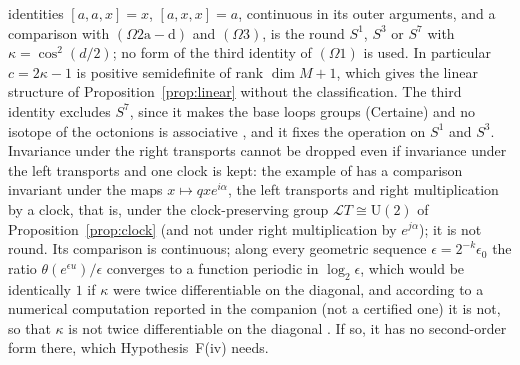 \documentclass[aps,pra,onecolumn,superscriptaddress,nofootinbib,10pt]{revtex4-2}
\theoremstyle{definition}
\theoremstyle{remark}
\newcommand{\cL}{\mathcal{L}}
\newcommand{\hp}[3]{[#1,#2,#3]}
\newcommand{\U}{\mathrm{U}}
\begin{document}
identities $\hp aax=x$, $\hp axx=a$, continuous in its outer arguments, and a comparison with
$(\Omega2\mathrm{a{-}d})$ and $(\Omega3)$, is the round $S^1$, $S^3$ or $S^7$ with $\kappa=\cos^2(d/2)$; no form of the third
identity of $(\Omega1)$ is used.  In particular $c=2\kappa-1$ is positive semidefinite of rank $\dim M+1$, which
gives the linear structure of Proposition~\ref{prop:linear} without the classification.  The third identity
excludes $S^7$, since it makes the base loops groups (Certaine) and no isotope of the octonions is
associative \cite[Rem.~5.25]{PaperI}, and it fixes the operation on $S^1$ and $S^3$.  Invariance under the right
transports cannot be dropped even if invariance under the left transports and one clock is kept: the
example of \cite[Prop.~5.26]{PaperI} has a comparison invariant under the maps $x\mapsto qxe^{i\alpha}$, the left
transports and right multiplication by a clock, that is, under the clock-preserving group $\cL T\cong\U(2)$ of
Proposition~\ref{prop:clock} (and not under right multiplication by $e^{j\alpha}$); it is not round.  Its comparison
is continuous; along every geometric sequence $\epsilon=2^{-k}\epsilon_0$ the ratio $\theta(e^{\epsilon u})/\epsilon$ converges to a
function periodic in $\log_2\epsilon$, which would be identically $1$ if $\kappa$ were twice differentiable on the
diagonal, and according to a numerical computation reported in the companion (not a certified one) it
is not, so that $\kappa$ is not twice differentiable on the diagonal \cite[Prop.~5.26(iv), Rem.~5.29]{PaperI}.  If so, it
has no second-order form there, which Hypothesis~F(iv) needs.
\end{document}
